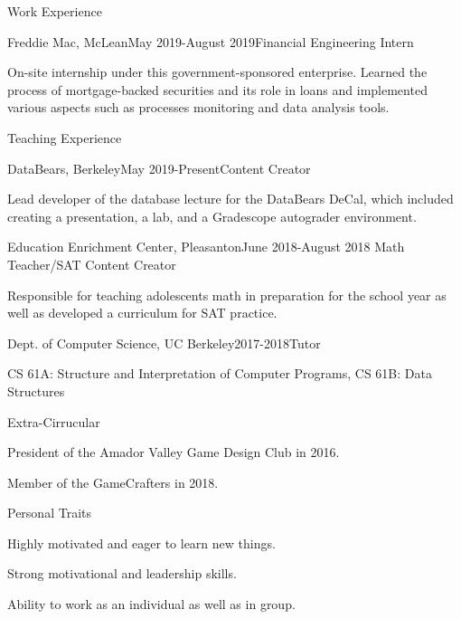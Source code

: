 \documentclass{resume} %
\begin{document}

\begin{rSection}{Work Experience}

\begin{rSubsection}{Freddie Mac, McLean}{May 2019-August 2019}{Financial Engineering Intern}{}
\item On-site internship under this government-sponsored enterprise. Learned the process of mortgage-backed securities and its role in loans and implemented various aspects such as processes monitoring and data analysis tools.
\end{rSubsection}

\end{rSection}



\begin{rSection}{Teaching Experience} 
\begin{rSubsection}{DataBears, Berkeley}{May 2019-Present}{Content Creator}{}
\item Lead developer of the database lecture for the DataBears DeCal, which included creating a presentation, a lab, and a Gradescope autograder environment.
\end{rSubsection}

\begin{rSubsection}{Education Enrichment Center, Pleasanton}{June 2018-August 2018 }{Math Teacher/SAT Content Creator}{}
\item Responsible for teaching adolescents math in preparation for the school year as well as developed a curriculum for SAT practice.
\end{rSubsection}

\begin{rSubsection}{Dept. of Computer Science, UC Berkeley}{2017-2018}{Tutor}{}
\item CS 61A: Structure and Interpretation of Computer Programs, CS 61B: Data Structures
\end{rSubsection}
\end{rSection}

\newpage

\begin{rSection}{Extra-Cirrucular} \itemsep -3pt
\item President of the Amador Valley Game Design Club in 2016.
\item Member of the GameCrafters in 2018.
\end{rSection}

\begin{rSection}{Personal Traits}
\item Highly motivated and eager to learn new things.
\item Strong motivational and leadership skills.
\item Ability to work as an individual as well as in group.
\end{rSection}
\end{document}
